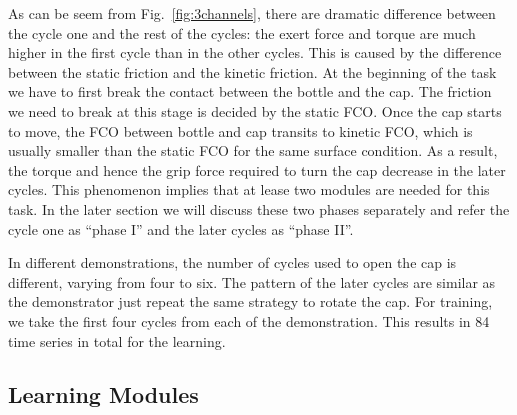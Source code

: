 As can be seem from Fig.~\ref{fig:3channels}, there are dramatic difference between the cycle one and the rest of the cycles: the exert force and torque are much higher in the first cycle than in the other cycles. This is caused by the difference between the static friction and the kinetic friction. At the beginning of the task we have to first break the contact between the bottle and the cap. The friction we need to break at this stage is decided by the static FCO. Once the cap starts to move, the FCO between bottle and cap transits to kinetic FCO, which is usually smaller than the static FCO for the same surface condition. As a result, the torque and hence the grip force required to turn the cap decrease in the later cycles. This phenomenon implies that at lease two modules are needed for this task. In the later section we will discuss these two phases separately and refer the cycle one as ``phase I'' and the later cycles as ``phase II''.

In different demonstrations, the number of cycles used to open the cap is different, varying from four to six. The pattern of the later cycles  are similar as the demonstrator just repeat the same strategy to rotate the cap. For training, we take the first four cycles from each of the demonstration. This results in 84 time series in total for the learning.








\subsection{Learning Modules}
\label{cha4:sec3:learning}

